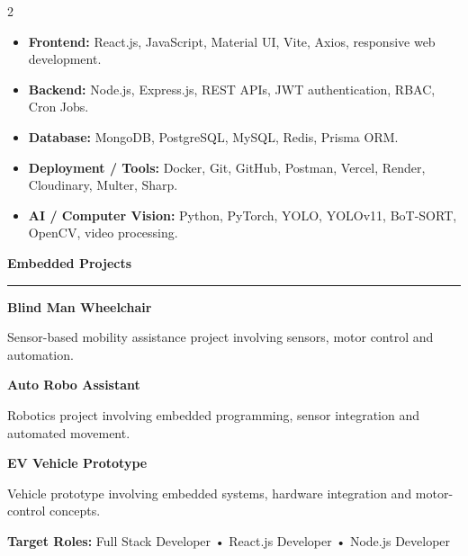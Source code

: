 ﻿\documentclass[10pt,a4paper]{article}
\newcommand{\cvsection}[1]{%
    \vspace{3pt}
    {\large\bfseries\textcolor{darkcol}{#1}}
    \par
    \vspace{2pt}
    {\color{accentcol}\rule{\linewidth}{1.1pt}}
    \vspace{3pt}
}
\begin{document}
\begin{paracol}{2}
\begin{itemize}
\item {\small
\textbf{Frontend:}
React.js, JavaScript, Material UI, Vite, Axios,
responsive web development.
}

\item {\small
\textbf{Backend:}
Node.js, Express.js, REST APIs, JWT authentication,
RBAC, Cron Jobs.
}

\item {\small
\textbf{Database:}
MongoDB, PostgreSQL, MySQL, Redis, Prisma ORM.
}

\item {\small
\textbf{Deployment / Tools:}
Docker, Git, GitHub, Postman, Vercel, Render,
Cloudinary, Multer, Sharp.
}

\item {\small
\textbf{AI / Computer Vision:}
Python, PyTorch, YOLO, YOLOv11, BoT-SORT,
OpenCV, video processing.
}

\end{itemize}


\cvsection{Embedded Projects}

{\small\bfseries Blind Man Wheelchair}

\vspace{1pt}

{\small
Sensor-based mobility assistance project involving sensors,
motor control and automation.
}

\vspace{3pt}

{\small\bfseries Auto Robo Assistant}

\vspace{1pt}

{\small
Robotics project involving embedded programming,
sensor integration and automated movement.
}

\vspace{3pt}

{\small\bfseries EV Vehicle Prototype}

\vspace{1pt}

{\small
Vehicle prototype involving embedded systems,
hardware integration and motor-control concepts.
}


\vspace{4pt}

{\small
\textbf{Target Roles:}
Full Stack Developer • React.js Developer • Node.js Developer
}


\end{paracol}
\end{document}
